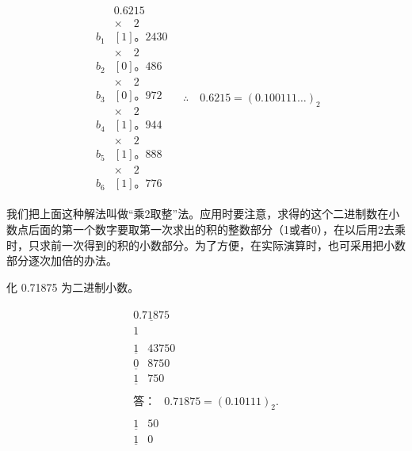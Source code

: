 \[
\begin{array}{l} \begin{array}{rl} & 0.6215 \\ & \times \quad 2 \\ b _{1} & [ 1 ]\text{。} 2430 \\ & \times \quad 2 \\ b _{2} & [ 0 ]\text{。} 486 \\ & \times \quad 2 \\ b _{3} & [ 0 ]\text{。} 972 \\ & \times \quad 2 \\ b _{4} & [ 1 ]\text{。} 944 \\ & \times \quad 2 \\ b _{5} & [ 1 ]\text{。} 888 \\ & \times \quad 2 \\ b _{6} & [ 1 ]\text{。} 776 \end{array} \quad \therefore \quad 0.6215 = (0.100111 \dots) _{2} \end{array}
\]

我们把上面这种解法叫做``乘2取整''法。应用时要注意，求得的这个二进制数在小数点后面的第一个数字要取第一次求出的积的整数部分（1或者0），在以后用2去乘时，只求前一次得到的积的小数部分。为了方便，在实际演算时，也可采用把小数部分逐次加倍的办法。

 化 0.71875 为二进制小数。


\[
\begin{array}{l} \begin{array}{cc} \underline {{0.71875}} \\ \hline 1 \end{array} \\ \begin{array}{cc} \underline {{1}} & 43750 \\ \underline {{0}} & 8750 \\ \underline {{1}} & 750 \end{array} \\ \begin{array}{cc} \text{答：} & 0.71875 = (0.10111) _{2}. \end{array} \\ \begin{array}{cc} \underline {{1}} & 50 \\ \underline {{1}} & 0 \end{array} \\ \end{array}
\]


